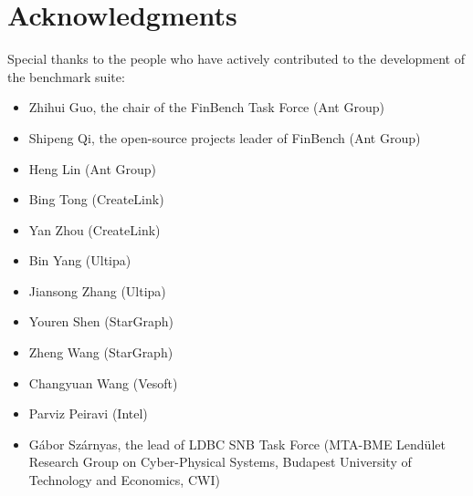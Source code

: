 \chapter*{Acknowledgments}
\label{sec:acknowledgments}

\renewcommand{\labelitemii}{\textbullet}

Special thanks to the people who have actively contributed to the development of the benchmark suite:

\begin{itemize}
  \item Zhihui Guo, the chair of the FinBench Task Force (Ant Group)
  \item Shipeng Qi, the open-source projects leader of FinBench (Ant Group)
  \item Heng Lin (Ant Group)
  \item Bing Tong (CreateLink)
  \item Yan Zhou (CreateLink)
  \item Bin Yang (Ultipa)
  \item Jiansong Zhang (Ultipa)
  \item Youren Shen (StarGraph)
  \item Zheng Wang (StarGraph)
  \item Changyuan Wang (Vesoft)
  \item Parviz Peiravi (Intel)
  \item Gábor Szárnyas, the lead of LDBC SNB Task Force (MTA-BME Lendület Research Group on Cyber-Physical Systems, Budapest University
        of Technology and Economics, CWI)
\end{itemize}